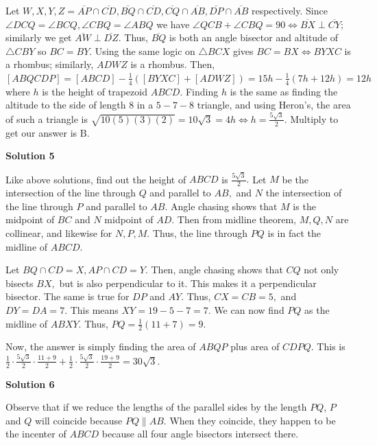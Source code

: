 \begin{enumerate}
 Let $W, X, Y, Z = \overline{AP} \cap \overline{CD}, \overline{BQ} \cap \overline{CD}, \overline{CQ} \cap \overline{AB}, \overline{DP} \cap \overline{AB}$ respectively. Since $\angle{DCQ} = \angle{BCQ}, \angle{CBQ} = \angle{ABQ}$ we have $\angle{QCB} + \angle{CBQ} = 90 \iff \overline{BX} \perp \overline{CY};$ similarly we get $\overline{AW} \perp \overline{DZ}.$ Thus, $\overline{BQ}$ is both an angle bisector and altitude of $\triangle{CBY}$ so $BC = BY.$ Using the same logic on $\triangle{BCX}$ gives $BC = BX \iff BYXC$ is a rhombus; similarly, $ADWZ$ is a rhombus. Then, $[ABQCDP] = [ABCD] - \frac{1}{4}\left([BYXC] + [ADWZ]\right) = 15h - \frac{1}{4}(7h + 12h) = 12h$ where $h$ is the height of trapezoid $ABCD.$ Finding $h$ is the same as finding the altitude to the side of length $8$ in a $5-7-8$ triangle, and using Heron's, the area of such a triangle is $\sqrt{10(5)(3)(2)} = 10 \sqrt{3} = 4h \iff h = \frac{5\sqrt{3}}{2}.$ Multiply to get our answer is $\boxed{\mathrm{B}}.$




\textbf{Solution 5}

Like above solutions, find out the height of $ABCD$ is $\frac{5 \sqrt{3}}{2}.$ Let $M$ be the intersection of the line through $Q$ and parallel to $AB,$ and $N$ the intersection of the line through $P$ and parallel to $AB.$ Angle chasing shows that $M$ is the midpoint of $BC$ and $N$ midpoint of $AD.$ Then from midline theorem,  $M, Q, N$ are collinear, and likewise for $N, P, M.$ Thus, the line through $PQ$ is in fact the midline of $ABCD.$

 
Let $BQ \cap CD = X, AP \cap CD = Y.$ Then, angle chasing shows that $CQ$ not only bisects $BX,$ but is also perpendicular to it. This makes it a perpendicular bisector. The same is true for $DP$ and $AY.$ Thus, $CX = CB = 5,$ and $DY = DA = 7.$ This means $XY = 19 - 5 - 7 = 7.$ We can now find $PQ$ as the midline of $ABXY.$ Thus, $PQ = \frac{1}{2} (11+7) = 9.$

 Now, the answer is simply finding the area of $ABQP$ plus area of $CDPQ.$ This is $\frac{1}{2} \cdot \frac{5 \sqrt{3}}{2} \cdot \frac{11+9}{2} + \frac{1}{2} \cdot \frac{5 \sqrt{3}}{2} \cdot \frac{19+9}{2}  = \boxed{30 \sqrt{3}}.$




\textbf{Solution 6}

Observe that if we reduce the lengths of the parallel sides by the length $PQ$, $P$ and $Q$ will coincide because $PQ \parallel AB.$ When they coincide, they happen to be the incenter of $ABCD$ because all four angle bisectors intersect there. 


\end{enumerate}
